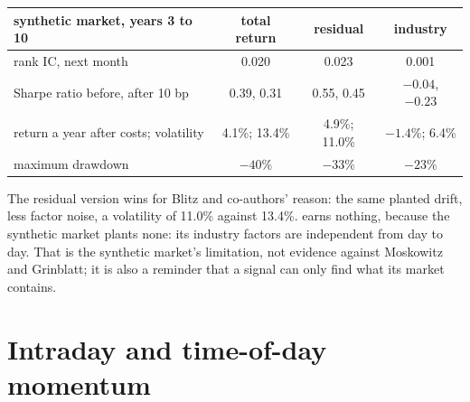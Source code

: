\begin{center}
\small
\begin{tabular}{@{}lccc@{}}
\toprule
synthetic market, years 3 to 10 & total return & residual & industry\\
\midrule
rank IC, next month & 0.020 & 0.023 & 0.001\\
Sharpe ratio before, after 10 bp & 0.39, 0.31 & 0.55, 0.45 & $-0.04$, $-0.23$\\
return a year after costs; volatility & 4.1\%; 13.4\% & 4.9\%; 11.0\% & $-1.4\%$; 6.4\%\\
maximum drawdown & $-40\%$ & $-33\%$ & $-23\%$\\
\bottomrule
\end{tabular}
\end{center}

The residual version wins for Blitz and co-authors' reason: the same planted drift, less factor noise, a volatility of 11.0\% against 13.4\%.  earns nothing, because the synthetic market plants none: its industry factors are independent from day to day. That is the synthetic market's
limitation, not evidence against Moskowitz and Grinblatt; it is also a reminder that a signal can only find what its market contains.

\begin{omfigure}

\label{fig:s1:momentum:books}
\end{omfigure}

\section{Intraday and time-of-day momentum}

